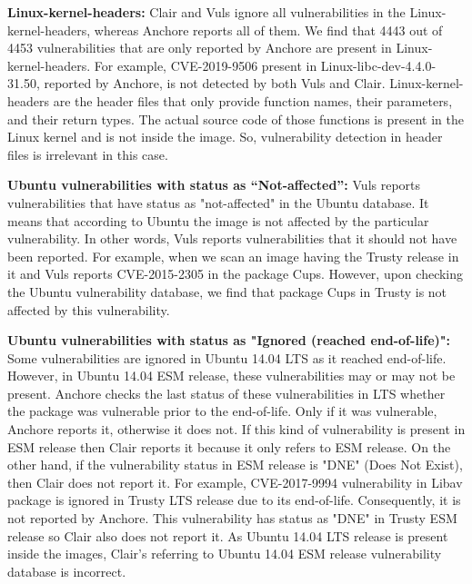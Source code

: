 \documentclass[a4paper,num-refs]{oup-contemporary}
\begin{document}
\textbf{Linux-kernel-headers:} Clair and Vuls ignore all vulnerabilities in the Linux-kernel-headers,
whereas Anchore reports all of them.
We find that 4443 out of 4453 vulnerabilities that are only reported by Anchore are present in Linux-kernel-headers.
For example, CVE-2019-9506 present in Linux-libc-dev-4.4.0-31.50, reported by Anchore, is not
detected by both Vuls and Clair.
Linux-kernel-headers are the header files that only provide function names, their parameters, and their
return types.
The actual source code of those functions is present in the Linux kernel and is not inside the image.
So, vulnerability detection in header files
is irrelevant in this case.

\textbf{Ubuntu vulnerabilities with status as “Not-affected”:} Vuls reports vulnerabilities that have status
as "not-affected" in the Ubuntu database. It means that according to Ubuntu the image is not affected
by the particular vulnerability. In other words, Vuls reports vulnerabilities that it should not have been reported.
For example, when we scan an image having the Trusty release in it and Vuls reports CVE-2015-2305
in the package Cups. However, upon checking the Ubuntu vulnerability database, we find that package Cups in Trusty is not
affected by this vulnerability.

\textbf{Ubuntu vulnerabilities with status as "Ignored (reached end-of-life)":}
Some vulnerabilities are ignored in Ubuntu 14.04 LTS as it reached end-of-life. 
However, in Ubuntu 14.04 ESM release, these vulnerabilities may or may not be present.
Anchore checks the last status of these vulnerabilities in LTS whether the package was vulnerable
prior to the end-of-life. Only if it was vulnerable, Anchore reports it, otherwise it does not.
If this kind of vulnerability is present in ESM release then Clair reports it because it
only refers to ESM release. On the other hand, if the vulnerability
status in ESM release is "DNE" (Does Not Exist), then Clair does not report it. 
For example, CVE-2017-9994 vulnerability in Libav package is ignored in Trusty LTS release due to its end-of-life.
Consequently, it is not reported by Anchore. This vulnerability has status as "DNE" in Trusty ESM
release so Clair also does not report it. As Ubuntu 14.04 LTS release is present inside the images,
Clair's referring to Ubuntu 14.04 ESM release vulnerability database is incorrect.
\end{document}

